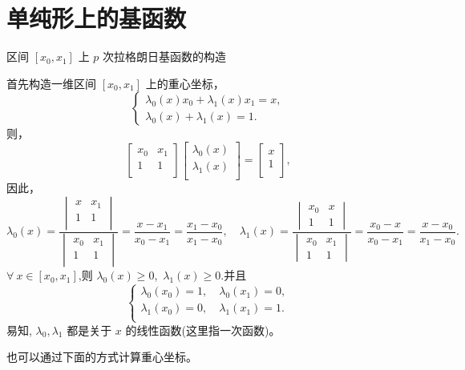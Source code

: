 \documentclass[12pt,a4paper]{article}
\begin{document}
\section{单纯形上的基函数}
区间 $[x_0,x_1]$ 上 $p$ 次拉格朗日基函数的构造

首先构造一维区间 $[x_0,x_1]$ 上的重心坐标，
$$
\begin{cases}
\lambda _0(x)x_0+\lambda _1(x)x_1=x,\\
\lambda _0(x)+\lambda _1(x)=1.
\end{cases}
$$
则，
$$
\begin{bmatrix}
x_0 & x_1\\
1 & 1\\
\end{bmatrix}
\begin{bmatrix}
\lambda _0(x)\\
\lambda _1(x)\\
\end{bmatrix}=\begin{bmatrix}
x\\
1\\
\end{bmatrix},
$$
因此，
$$
\lambda _0(x)=\frac{\begin{vmatrix}
x & x_1 \\
1 & 1 \\
\end{vmatrix}}{\begin{vmatrix}
x_0 & x_1 \\
1 & 1 \\
\end{vmatrix}}=\frac{x-x_1}{x_0-x_1}=\frac{x_1-x_0}{x_1-x_0},
\quad\lambda _1(x)=\frac{\begin{vmatrix}
x_0 & x \\
1 & 1
\end{vmatrix}}{\begin{vmatrix}
x_0 & x_1 \\
1 & 1
\end{vmatrix}}=\frac{x_0-x}{x_0-x_1}=\frac{x-x_0}{x_1-x_0}.
$$
$\forall ~x\in [x_0,x_1]$,则 $\lambda _0(x)\ge 0$,~$\lambda _1(x)\ge 0$.并且
$$
\begin{cases}
\lambda _0 (x_0)=1,\quad\lambda _0 (x_1)=0,\\
\lambda _1 (x_0)=0,\quad\lambda _1 (x_1)=1.\\
\end{cases}
$$
易知, $\lambda_0, \lambda_1$ 都是关于 $x$ 的线性函数(这里指一次函数)。

也可以通过下面的方式计算重心坐标。
\end{document}
